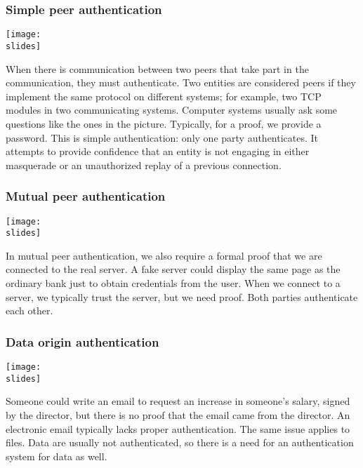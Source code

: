 \subsubsection*{Simple peer authentication}

\noindent
\begin{minipage}{0.5\textwidth}
  \centering
  \texttt{[image: \\slides]}
\end{minipage}
\hspace{0.05\textwidth}
\begin{minipage}{0.4\textwidth}
  When there is communication between two peers that take part in the communication, they must authenticate. Two entities are considered peers if they implement the same protocol on different systems; for example, two TCP modules in two communicating systems. Computer systems usually ask some questions like the ones in the picture. Typically, for a proof, we provide a password. This is simple authentication: only one party authenticates. It attempts to provide confidence that an entity is not engaging in either masquerade or an unauthorized replay of a previous connection.
\end{minipage}


\subsubsection*{Mutual peer authentication}
\noindent
\begin{minipage}{0.5\textwidth}
  \centering
  \texttt{[image: \\slides]}
\end{minipage}
\hspace{0.05\textwidth}
\begin{minipage}{0.4\textwidth}
  In mutual peer authentication, we also require a formal proof that we are connected to the real server. A fake server could display the same page as the ordinary bank just to obtain credentials from the user. When we connect to a server, we typically trust the server, but we need proof. Both parties authenticate each other.
\end{minipage}

\subsubsection*{Data origin authentication}
\noindent
\begin{minipage}{0.5\textwidth}
  \centering
  \texttt{[image: \\slides]}
\end{minipage}
\hspace{0.05\textwidth}
\begin{minipage}{0.4\textwidth}
  Someone could write an email to request an increase in someone's salary, signed by the director, but there is no proof that the email came from the director. An electronic email typically lacks proper authentication. The same issue applies to files. Data are usually not authenticated, so there is a need for an authentication system for data as well.
\end{minipage}

